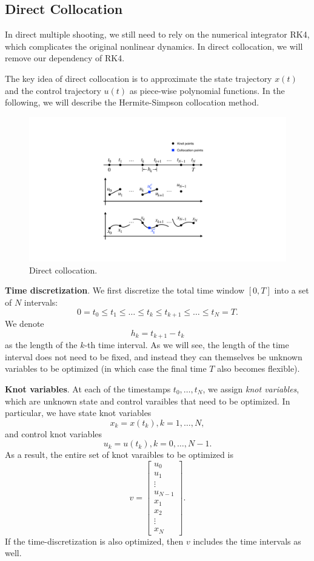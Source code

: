 \documentclass[
]{book}
\theoremstyle{definition}
\theoremstyle{definition}
\theoremstyle{definition}
\theoremstyle{definition}
\theoremstyle{remark}
\begin{document}
\hypertarget{direct-collocation}{%
\subsection{Direct Collocation}\label{direct-collocation}}

In direct multiple shooting, we still need to rely on the numerical integrator RK4, which complicates the original nonlinear dynamics. In direct collocation, we will remove our dependency of RK4.

The key idea of direct collocation is to approximate the state trajectory \(x(t)\) and the control trajectory \(u(t)\) as piece-wise polynomial functions. In the following, we will describe the Hermite-Simpson collocation method.

\begin{figure}

{\centering \includegraphics[width=0.6\linewidth]{images/direct_collocation} 

}

\caption{Direct collocation.}\label{fig:direct-collocation}
\end{figure}

\textbf{Time discretization}. We first discretize the total time window \([0,T]\) into a set of \(N\) intervals:
\[
0 = t_0 \leq t_1 \leq \dots \leq t_k \leq t_{k+1} \leq \dots \leq t_N = T.
\]
We denote
\[
h_k = t_{k+1} - t_k
\]
as the length of the \(k\)-th time interval. As we will see, the length of the time interval does not need to be fixed, and instead they can themselves be unknown variables to be optimized (in which case the final time \(T\) also becomes flexible).

\textbf{Knot variables}. At each of the timestamps \(t_0,\dots,t_N\), we assign \emph{knot variables}, which are unknown state and control varaibles that need to be optimized. In particular, we have state knot variables
\[
x_k = x(t_k), k=1,\dots,N,
\]
and control knot variables
\[
u_k = u(t_k),k=0,\dots,N-1.
\]
As a result, the entire set of knot varaibles to be optimized is
\begin{equation}
v = \begin{bmatrix} u_0 \\ u_1 \\ \vdots \\ u_{N-1} \\ x_1 \\ x_2 \\ \vdots \\ x_{N} \end{bmatrix}.
\label{eq:knot-variables}
\end{equation}
If the time-discretization is also optimized, then \(v\)
includes the time intervals as well.
\end{document}
